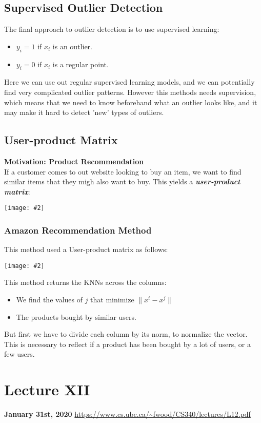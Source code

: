 \documentclass{article}
\def\blu#1{{\color{blu}#1}}
\def\gre#1{{\color{gre}#1}}
\def\norm#1{\|#1\|}
\theoremstyle{definition}
\newcommand{\centerfig}[2]{\begin{center}\texttt{[image: \#2]}\end{center}}
\begin{document}
\subsection*{Supervised Outlier Detection}
The final approach to outlier detection is to use \blu{supervised learning}:
\begin{itemize}
	\item $ y_i =1 $ if $ x_i $ is an outlier.
	\item $ y_i =0 $ if $ x_i $ is a regular point.
\end{itemize} 
Here we can use out regular supervised learning models, and we can potentially find very complicated outlier patterns. However this methods needs supervision, which means that we need to know beforehand what an outlier looks like, and it may make it hard to detect 'new' types of outliers. 

\subsection*{User-product Matrix}
\textbf{Motivation: Product Recommendation} \\
If a customer comes to out website looking to buy an item, we want to find \blu{similar items} that they migh also want to buy. This yields a \textbf{\textit{user-product matrix}}:
\centerfig{0.8}{Pic24}

\subsubsection*{Amazon Recommendation Method}
This method used a User-product matrix as follows:
\centerfig{0.4}{Pic25}
This method returns the \gre{KNNs across the columns}:
\begin{itemize}
	\item We find the values of $ j $ that minimize $ \norm{x^i - x^j} $
	\item The products bought by similar users. 
\end{itemize}
But first we have to divide each column by its norm, to normalize the vector. This is necessary to reflect if a product has been bought by a lot of users, or a few users. 



\newpage
\section*{Lecture XII}
\textbf{January 31st, 2020}
\url{https://www.cs.ubc.ca/~fwood/CS340/lectures/L12.pdf}
\end{document}
